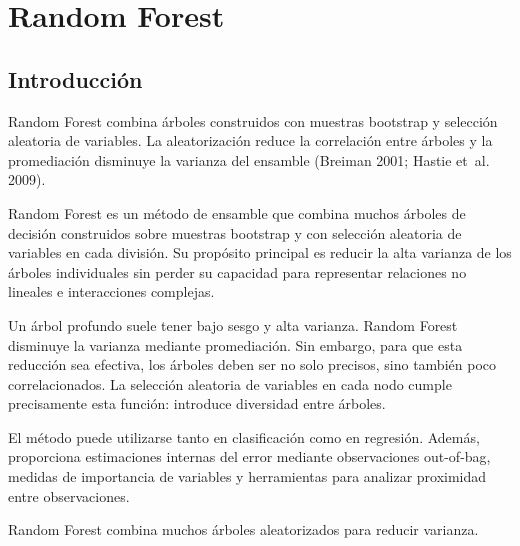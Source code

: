 \documentclass[
  spanish,
  10.5pt,
  letterpaper,
  DIV=11,
  numbers=noendperiod,
  oneside,
  open=any]{scrreprt}
\theoremstyle{definition}
\theoremstyle{definition}
\theoremstyle{plain}
\theoremstyle{remark}
\begin{document}
\chapter{\texorpdfstring{Random
Forest}{Random Forest}}\label{sec-random-forest}

\section*{Introducción}\label{introducciuxf3n-14}


Random Forest combina árboles construidos con muestras bootstrap y
selección aleatoria de variables. La aleatorización reduce la
correlación entre árboles y la promediación disminuye la varianza del
ensamble (Breiman 2001; Hastie et~al. 2009).

Random Forest es un método de ensamble que combina muchos árboles de
decisión construidos sobre muestras bootstrap y con selección aleatoria
de variables en cada división. Su propósito principal es reducir la alta
varianza de los árboles individuales sin perder su capacidad para
representar relaciones no lineales e interacciones complejas.

Un árbol profundo suele tener bajo sesgo y alta varianza. Random Forest
disminuye la varianza mediante promediación. Sin embargo, para que esta
reducción sea efectiva, los árboles deben ser no solo precisos, sino
también poco correlacionados. La selección aleatoria de variables en
cada nodo cumple precisamente esta función: introduce diversidad entre
árboles.

El método puede utilizarse tanto en clasificación como en regresión.
Además, proporciona estimaciones internas del error mediante
observaciones out-of-bag, medidas de importancia de variables y
herramientas para analizar proximidad entre observaciones.

\begin{tcolorbox}[enhanced jigsaw, arc=.35mm, bottomrule=.15mm, bottomtitle=1mm, breakable, colback=white, colbacktitle=quarto-callout-important-color!10!white, colframe=quarto-callout-important-color-frame, coltitle=black, left=2mm, leftrule=.75mm, opacityback=0, opacitybacktitle=0.6, rightrule=.15mm, title=\textcolor{quarto-callout-important-color}{\faExclamation}\hspace{0.5em}{Definición esencial}, titlerule=0mm, toprule=.15mm, toptitle=1mm]

Random Forest combina muchos árboles aleatorizados para reducir
varianza.

\end{tcolorbox}
\end{document}
